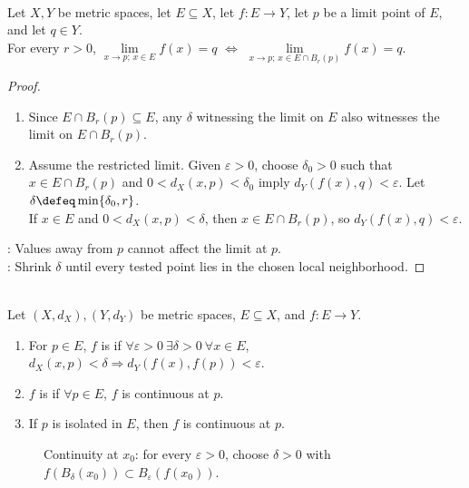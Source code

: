 \begin{proposition} \label{prop:function-limits-are-local} \\
Let $X,Y$ be metric spaces, let $E\subseteq X$, let $f:E\to Y$, let $p$ be a limit point of $E$, and let $q\in Y$.\\
For every $r>0$, $\lim\limits_{x\to p;\,x\in E}f(x)=q$ $\Longleftrightarrow$ $\lim\limits_{x\to p;\,x\in E\cap B_r(p)}f(x)=q$.
\begin{proof}
\begin{enumerate}[label=\roman*.]
\setlength{\itemsep}{0pt}
\item[$(\Rightarrow)$] Since $E\cap B_r(p)\subseteq E$, any $\delta$ witnessing the limit on $E$ also witnesses the limit on $E\cap B_r(p)$.
\item[$(\Leftarrow)$] Assume the restricted limit. Given $\varepsilon>0$, choose $\delta_0>0$ such that $x\in E\cap B_r(p)$ and $0<d_X(x,p)<\delta_0$ imply $d_Y(f(x),q)<\varepsilon$. Let $\delta\defeq\min\{\delta_0,r\}$.\\
If $x\in E$ and $0<d_X(x,p)<\delta$, then $x\in E\cap B_r(p)$, so $d_Y(f(x),q)<\varepsilon$.
\end{enumerate}
: Values away from $p$ cannot affect the limit at $p$.\\
: Shrink $\delta$ until every tested point lies in the chosen local neighborhood.
\end{proof}
\end{proposition}

\begin{definition} \label{def:continuity-at-a-point-and-on-a-set} \\
Let $(X,d_X),(Y,d_Y)$ be metric spaces, $E\subseteq X$, and $f:E\to Y$.
\begin{enumerate}[label=(\roman*)]
\setlength{\itemsep}{0pt}
\item For $p\in E$, $f$ is  if $\forall\varepsilon>0\ \exists\delta>0\ \forall x\in E$, $d_X(x,p)<\delta\Longrightarrow d_Y(f(x),f(p))<\varepsilon$.
\item $f$ is  if $\forall p\in E$, $f$ is continuous at $p$.
\item If $p$ is isolated in $E$, then $f$ is continuous at $p$.
\end{enumerate}
\end{definition}

\begin{figure}[H]
  \centering
  
  \caption{Continuity at $x_0$: for every $\varepsilon>0$, choose
  $\delta>0$ with $f(B_\delta(x_0))\subset B_\varepsilon(f(x_0))$.}
  \label{fig:metric-continuity-ball-mapping}
\end{figure}

